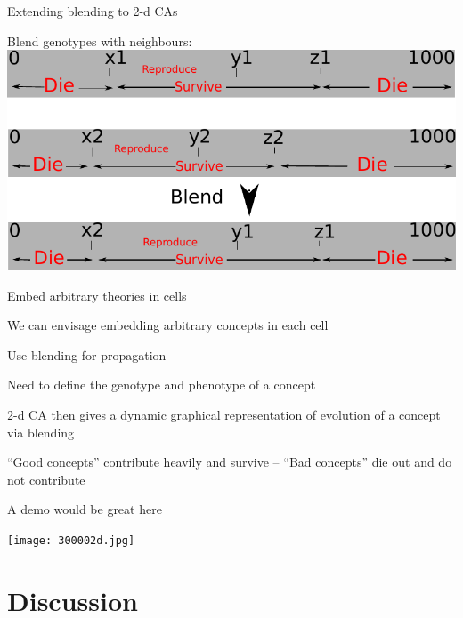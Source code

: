 \begin{frame}{Extending blending to 2-d CAs}{}
\begin{center}
\item{Blend genotypes with neighbours:}
\includegraphics[width=.9\textwidth]{2dgenotypeblend.pdf}
\end{center}
\end{frame}

\begin{frame}{Embed arbitrary theories in cells}{}
\begin{center}
\item{We can envisage embedding arbitrary concepts in each cell}
\item{Use blending for propagation}
\item{Need to define the genotype and phenotype of a concept}
\item{2-d CA then gives a dynamic graphical representation of evolution of a concept via blending}
\item{``Good concepts'' contribute heavily and survive -- ``Bad concepts'' die out and do not contribute}
\end{center}
\end{frame}

\begin{frame}{A demo would be great here}{}
\begin{center}
\texttt{[image: 300002d.jpg]}
\end{center}
\end{frame}

\part{Discussion}
\frame{\partpage}

